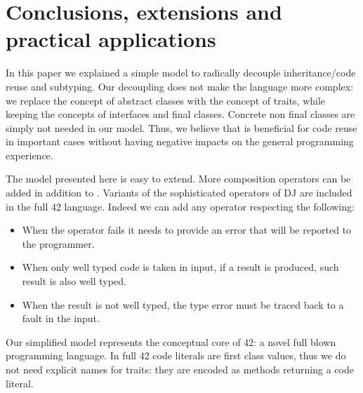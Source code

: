 \saveSpace\saveSpace
\section{Conclusions, extensions and practical applications}
\saveSpace
In this paper we explained a simple model to 
radically decouple inheritance/code reuse and subtyping.
Our decoupling does not
make the language more complex:
we replace the concept of abstract classes with
the concept of traits, while keeping the concepts of
interfaces and final classes.
Concrete non final classes are simply not needed in our model.
Thus, we believe that \name is beneficial for
code reuse in important cases 
without having negative impacts on the general programming experience.

The model presented here is easy to extend.
More composition operators can be added in addition to \use.
Variants of the sophisticated operators of DJ are
included in the full 42 language.
 Indeed we can add any operator respecting the following:

\begin{itemize}
\item When the operator fails it needs to provide an error that will be reported to the programmer.
\item When only well typed code is taken in input, if a result is produced,
 such result is also well typed.
\item When the result is not well typed,
the type error must be traced back to
a fault in the input.
 \end{itemize}
 

Our simplified model represents the conceptual core of  42: a novel full blown programming language.
In full 42 code literals are first class values, thus we
do not need explicit names
for traits: they are encoded as methods
 returning a code literal.

\begin{comment}
using the ideas presented in this paper to obtain reliable and understandable metaprogramming.
Formalization (in progress) for full 42 can be found at
\url{http://}\footnote{Omitted for anonymous review}. 
42 extends our model allowing
flattening to execute arbitrary computations.
In such model we do not need an explicit notion of traits: they are encoded as methods returning a code literal.
42 also has features less related to code composition, like
  a strong type system supporting aliasing mutability and circularity control,
   checked exceptions, and errors (unchecked exceptions) with strong-exception-safety.


42 do not have a finite set of composition operators; they can be
added using the built in support for native method calls. They can
be dynamically checked to verify that they are well behaved
according to our predicate, or they can be trusted to achieve
efficiency.
\end{comment}


